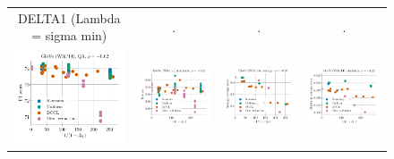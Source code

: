 \begin{figure}
\begin{tabular}{@{\hskip -0.0in}c@{\hskip -0.0in}c@{\hskip -0.0in}c@{\hskip -0.0in}c@{\hskip -0.0in}}
		DELTA1 (Lambda = sigma min) & . & . & . \\
		\includegraphics[width=.245\linewidth]{figures/glove400k_qa_best-f1_vs_gram-large-dim-delta1-2-trans_linx.pdf} &
		\includegraphics[width=.245\linewidth]{figures/glove400k_sentiment_trec_test-acc_vs_gram-large-dim-delta1-2-trans_linx.pdf} &
		\includegraphics[width=.245\linewidth]{figures/glove400k_intrinsics_analogy-avg-score_vs_gram-large-dim-delta1-2-trans_linx.pdf} &
		\includegraphics[width=.245\linewidth]{figures/glove400k_intrinsics_similarity-avg-score_vs_gram-large-dim-delta1-2-trans_linx.pdf} \\		
		

\end{tabular}
\end{figure}
